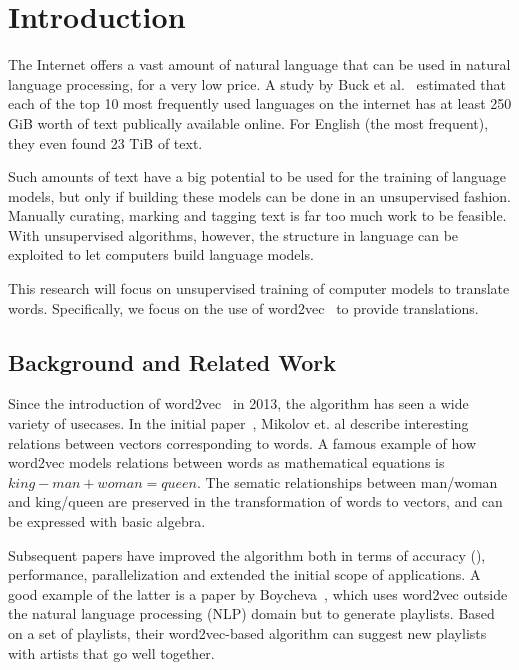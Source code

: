 \section{Introduction}
\label{sec:introduction}
The Internet offers a vast amount of natural language that can be used in natural language processing, for a very low price. A study by Buck et al.~\cite{buck2014n} estimated that each of the top 10 most frequently used languages on the internet has at least 250 GiB worth of text publically available online. For English (the most frequent), they even found 23 TiB of text.

Such amounts of text have a big potential to be used for the training of language models, but only if building these models can be done in an unsupervised fashion. Manually curating, marking and tagging text is far too much work to be feasible. With unsupervised algorithms, however, the structure in language can be exploited to let computers build language models.

This research will focus on unsupervised training of computer models to translate words. Specifically, we focus on the use of word2vec~\cite{mikolov2013efficient} to provide translations.


\subsection{Background and Related Work}
\label{sec:prior_work}
Since the introduction of word2vec~\cite{mikolov2013efficient, mikolov2013distributed} in 2013, the algorithm has seen a wide variety of usecases. In the initial paper~\cite{mikolov2013efficient}, Mikolov et. al describe interesting relations between vectors corresponding to words. 
A famous example of how word2vec models relations between words as mathematical equations is $king - man + woman = queen$.
The sematic relationships between man/woman and king/queen are preserved in the transformation of words to vectors, and can be expressed with basic algebra.

Subsequent papers have improved the algorithm both in terms of accuracy (\cite{levy2014linguistic}), performance, parallelization and extended the initial scope of applications. A good example of the latter is a paper by Boycheva~\cite{boycheva2015distributional}, which uses word2vec outside the natural language processing (NLP) domain but to generate playlists. Based on a set of playlists, their word2vec-based algorithm can suggest new playlists with artists that go well together.

